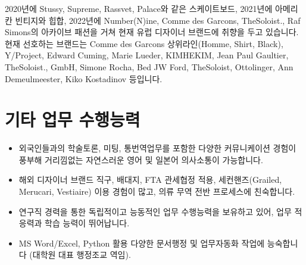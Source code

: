 2020년에 Stussy, Supreme, Rassvet, Palace와 같은 스케이트보드, 2021년에 아메리칸 빈티지와 힙합, 2022년에 Number(N)ine, Comme des Garcons, TheSoloist., Raf Simons의 아카이브 패션을 거쳐 현재 유럽 디자이너 브랜드에 취향을 두고 있습니다. 현재 선호하는 브랜드는 Comme des Garcons 상위라인(Homme, Shirt, Black), Y/Project, Edward Cuming, Marie Lueder, KIMHEKIM, Jean Paul Gaultier, TheSoloist., GmbH, Simone Rocha, Bed JW Ford, TheSoloist, Ottolinger, Ann Demeulmeester, Kiko Kostadinov 등입니다.

\section*{기타 업무 수행능력}
\begin{itemize}
    \item 외국인들과의 학술토론, 미팅, 통번역업무를 포함한 다양한 커뮤니케이션 경험이 풍부해 거리낌없는 자연스러운 영어 및 일본어 의사소통이 가능합니다.
    \item 해외 디자이너 브랜드 직구, 배대지, FTA 관세협정 적용, 세컨핸즈(Grailed, Merucari, Vestiaire) 이용 경험이 많고, 의류 무역 전반 프로세스에 친숙합니다.
    
    \item 연구직 경력을 통한 독립적이고 능동적인 업무 수행능력을 보유하고 있어, 업무 적응력과 학습 능력이 뛰어납니다.
    \item MS Word/Excel, Python 활용 다양한 문서행정 및 업무자동화 작업에 능숙합니다 (대학원 대표 행정조교 역임).
\end{itemize}